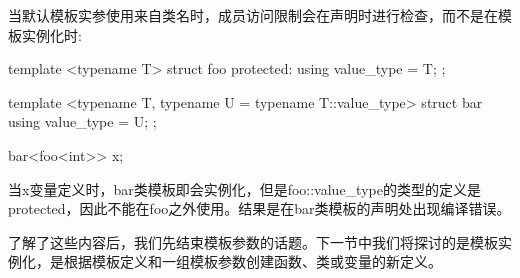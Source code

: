 当默认模板实参使用来自类名时，成员访问限制会在声明时进行检查，而不是在模板实例化时:

\begin{cpp}
template <typename T>
struct foo
{
	protected:
	using value_type = T;
};

template <typename T, typename U = typename T::value_type>
struct bar
{
	using value_type = U;
};

bar<foo<int>> x;
\end{cpp}

当x变量定义时，bar类模板即会实例化，但是foo::value\_type的类型的定义是protected，因此不能在foo之外使用。结果是在bar类模板的声明处出现编译错误。

了解了这些内容后，我们先结束模板参数的话题。下一节中我们将探讨的是模板实例化，是根据模板定义和一组模板参数创建函数、类或变量的新定义。








